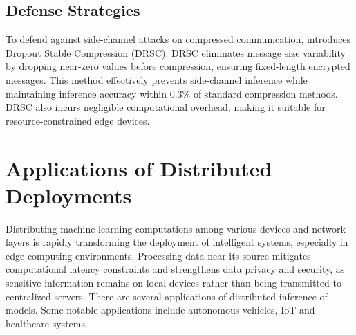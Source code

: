 \documentclass[conference]{IEEEtran}
\begin{document}
\subsection{Defense Strategies}
To defend against side-channel attacks on compressed communication, \cite{kannan2024security} introduces Dropout Stable Compression (DRSC). DRSC eliminates message size variability by dropping near-zero values before compression, ensuring fixed-length encrypted messages. This method effectively prevents side-channel inference while maintaining inference accuracy within 0.3\% of standard compression methods. DRSC also incurs negligible computational overhead, making it suitable for resource-constrained edge devices.



\section{Applications of Distributed Deployments}

Distributing machine learning computations among various devices and network layers is rapidly transforming the deployment of intelligent systems, especially in edge computing environments. Processing data near its source mitigates computational latency constraints and strengthens data privacy and security, as sensitive information remains on local devices rather than being transmitted to centralized servers. There are several applications of distributed inference of models. Some notable applications include autonomous vehicles, IoT and healthcare systems.

\end{document}
